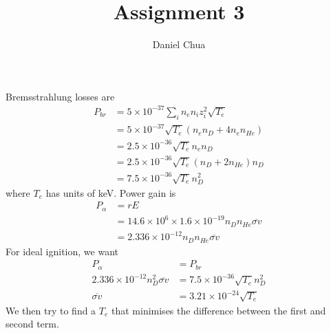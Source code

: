 \documentclass[answers]{exam}
\title{Assignment 3}
\author{Daniel Chua}
\begin{document}
\maketitle

\begin{questions}


\begin{solution}
    Bremsstrahlung losses are
    \begin{align*}
        P_{br} &= 5\times10^{-37} \sum_i n_en_iz_i^2 \sqrt{T_e} \\
               &= 5\times10^{-37} \sqrt{T_e} (n_en_D + 4n_en_{He}) \\
               &= 2.5\times10^{-36} \sqrt{T_e} n_en_D \\
               &= 2.5\times10^{-36} \sqrt{T_e} (n_D + 2n_{He}) n_D \\
               &= 7.5\times10^{-36} \sqrt{T_e} n_D^2
    \end{align*}
    where $T_e$ has units of keV. Power gain is
    \begin{align*}
        P_\alpha &= rE \\
          &= 14.6 \times 10^6 \times 1.6 \times 10^{-19} n_Dn_{He}\overline{\sigma v} \\
          &= 2.336 \times 10^{-12} n_Dn_{He}\overline{\sigma v}
    \end{align*}
    For ideal ignition, we want
    \begin{align*}
        P_\alpha &= P_{br} \\
        2.336 \times 10^{-12} n_D^2 \overline{\sigma v} &= 7.5 \times 10^{-36} \sqrt{T_e} n_D^2 \\
        \overline{\sigma v} &= 3.21 \times 10^{-24} \sqrt{T_e}
    \end{align*}
    We then try to find a $T_e$ that minimises the difference between the first and second term.

\end{solution}
\end{questions}
\end{document}
